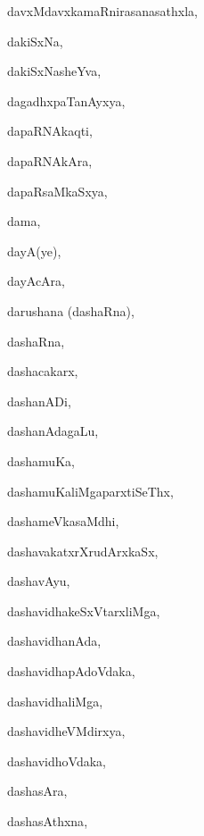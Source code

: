\begin{multicols}{3}
{\noindent
{davxMdavxkamaRnirasanasathxla}, \pageref{davxMdavxkamaRnirasanasathxla}

\noindent
{dakiSxNa}, \pageref{dakiSxNa}

\noindent
{dakiSxNasheYva}, \pageref{dakiSxNasheYva}

\noindent
{dagadhxpaTanAyxya}, \pageref{dagadhxpaTanAyxya}

\noindent
{dapaRNAkaqti}, \pageref{dapaRNAkaqti}

\noindent
{dapaRNAkAra}, \pageref{dapaRNAkAra}

\noindent
{dapaRsaMkaSxya}, \pageref{dapaRsaMkaSxya}

\noindent
{dama}, \pageref{dama}

\noindent
{dayA(ye)}, \pageref{dayAye}

\noindent
{dayAcAra}, \pageref{dayAcAra}

\noindent
{darushana (dashaRna)}, \pageref{darushana dashaRna}

\noindent
{dashaRna}, \pageref{dashaRna}

\noindent
{dashacakarx}, \pageref{dashacakarx}

\noindent
{dashanADi}, \pageref{dashanADi}

\noindent
{dashanAda\-gaLu}, \pageref{dashanAdagaLu}

\noindent
{dashamuKa}, \pageref{dashamuKa}

\noindent
{dashamuKaliMgaparxtiSeThx}, \pageref{dashamuKaliMgaparxtiSeThx}

\noindent
{dashameVkasaMdhi}, \pageref{dashameVkasaMdhi}

\noindent
{dashavakatxrXrudArxkaSx}, \pageref{dashavakatxrXrudArxkaSx}

\noindent
{dashavAyu}, \pageref{dashavAyu}

\noindent
{dashavidhakeSxVtarxliMga}, \pageref{dashavidhakeSxVtarxliMga}

\noindent
{dashavidhanAda}, \pageref{dashavidhanAda}

\noindent
{dashavidhapAdoVdaka}, \pageref{dashavidhapAdoVdaka}

\noindent
{dashavidhaliMga}, \pageref{dashavidhaliMga}

\noindent
{dashavidheVMdirxya}, \pageref{dashavidheVMdirxya}

\noindent
{dashavidhoVdaka}, \pageref{dashavidhoVdaka}

\noindent
{dashasAra}, \pageref{dashasAra}

\noindent
{dashasAthxna}, \pageref{dashasAthxna}

}
\end{multicols}
